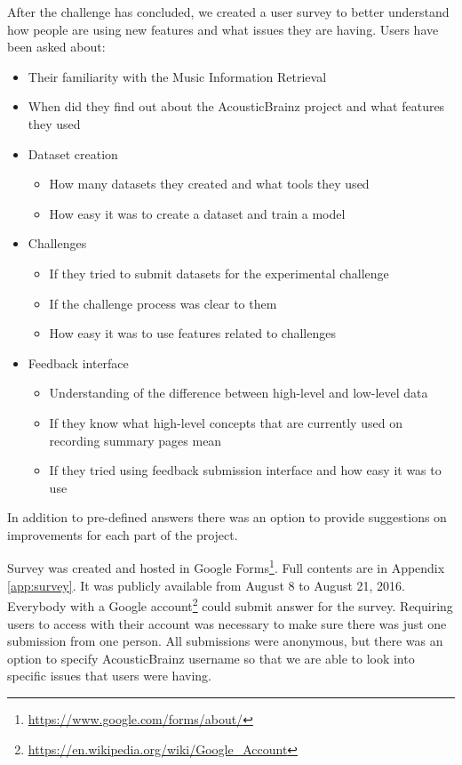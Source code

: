 After the challenge has concluded, we created a user survey to better understand how people are using new features and what issues they are having. Users have been asked about:
\begin{itemize}
    \item Their familiarity with the Music Information Retrieval
    \item When did they find out about the AcousticBrainz project and what features they used
    \item Dataset creation
        \begin{itemize}
            \item How many datasets they created and what tools they used
            \item How easy it was to create a dataset and train a model
        \end{itemize}
    \item Challenges
        \begin{itemize}
            \item If they tried to submit datasets for the experimental challenge
            \item If the challenge process was clear to them
            \item How easy it was to use features related to challenges
        \end{itemize}
    \item Feedback interface
        \begin{itemize}
            \item Understanding of the difference between high-level and low-level data
            \item If they know what high-level concepts that are currently used on recording summary pages mean
            \item If they tried using feedback submission interface and how easy it was to use
        \end{itemize}
\end{itemize}

In addition to pre-defined answers there was an option to provide suggestions on improvements for each part of the project.

Survey was created and hosted in Google Forms\footnote{\url{https://www.google.com/forms/about/}}. Full contents are in Appendix \ref{app:survey}. It was publicly available from August 8 to August 21, 2016. Everybody with a Google account\footnote{\url{https://en.wikipedia.org/wiki/Google_Account}} could submit answer for the survey. Requiring users to access with their account was necessary to make sure there was just one submission from one person. All submissions were anonymous, but there was an option to specify AcousticBrainz username so that we are able to look into specific issues that users were having.

